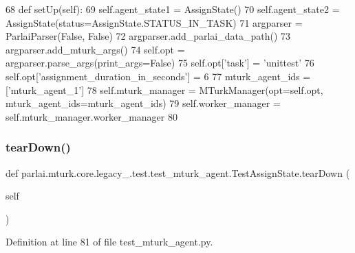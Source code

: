 \begin{DoxyCode}
68     \textcolor{keyword}{def }setUp(self):
69         self.agent\_state1 = AssignState()
70         self.agent\_state2 = AssignState(status=AssignState.STATUS\_IN\_TASK)
71         argparser = ParlaiParser(\textcolor{keyword}{False}, \textcolor{keyword}{False})
72         argparser.add\_parlai\_data\_path()
73         argparser.add\_mturk\_args()
74         self.opt = argparser.parse\_args(print\_args=\textcolor{keyword}{False})
75         self.opt[\textcolor{stringliteral}{'task'}] = \textcolor{stringliteral}{'unittest'}
76         self.opt[\textcolor{stringliteral}{'assignment\_duration\_in\_seconds'}] = 6
77         mturk\_agent\_ids = [\textcolor{stringliteral}{'mturk\_agent\_1'}]
78         self.mturk\_manager = MTurkManager(opt=self.opt, mturk\_agent\_ids=mturk\_agent\_ids)
79         self.worker\_manager = self.mturk\_manager.worker\_manager
80 
\end{DoxyCode}
\mbox{\label{classparlai_1_1mturk_1_1core_1_1legacy__2018_1_1test_1_1test__mturk__agent_1_1TestAssignState_a14fe181d3171e9bcc2bc1de035d1dd1c}} 
\subsubsection{\texorpdfstring{tear\+Down()}{tearDown()}}
{\footnotesize\ttfamily def parlai.\+mturk.\+core.\+legacy\+\_.\+test.\+test\+\_\+mturk\+\_\+agent.\+Test\+Assign\+State.\+tear\+Down (\begin{DoxyParamCaption}\item[{}]{self }\end{DoxyParamCaption})}



Definition at line 81 of file test\+\_\+mturk\+\_\+agent.\+py.


